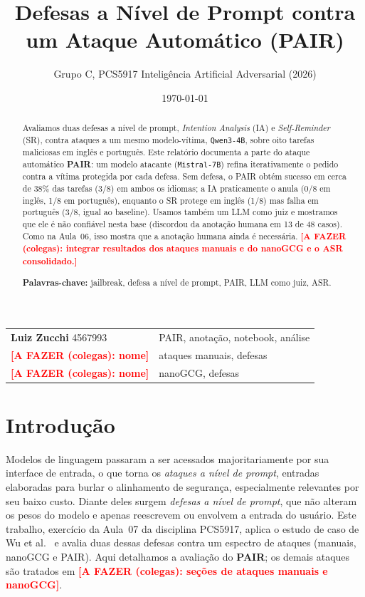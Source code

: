 \documentclass[10pt,twocolumn]{article}
\title{\vspace{-3ex}\textbf{Defesas a Nível de Prompt contra um Ataque Automático (PAIR)}}
\author{\normalsize Grupo C, PCS5917 Inteligência Artificial Adversarial (2026)}
\date{\vspace{-2ex}\small \today}
\newcommand{\todo}[1]{\textcolor{red}{\textbf{[A FAZER (colegas): #1]}}}
\begin{document}
\maketitle
\vspace{-3ex}

\begin{center}\small
\begin{tabular}{@{}ll@{}}
\textbf{Luiz Zucchi} 4567993 & PAIR, anotação, notebook, análise \\
\textbf{\todo{nome}} & ataques manuais, defesas \\
\textbf{\todo{nome}} & nanoGCG, defesas \\
\end{tabular}
\end{center}
\vspace{0.5ex}

\begin{abstract}\small
\noindent Avaliamos duas defesas a nível de prompt, \emph{Intention Analysis} (IA) e
\emph{Self-Reminder} (SR), contra ataques a um mesmo modelo-vítima,
\texttt{Qwen3-4B}, sobre oito tarefas maliciosas em inglês e português. Este relatório
documenta a parte do ataque automático \textbf{PAIR}: um modelo atacante
(\texttt{Mistral-7B}) refina iterativamente o pedido contra a vítima protegida por cada
defesa. Sem defesa, o PAIR obtém sucesso em cerca de 38\% das tarefas (3/8) em ambos os
idiomas; a IA praticamente o anula (0/8 em inglês, 1/8 em português), enquanto o SR
protege em inglês (1/8) mas falha em português (3/8, igual ao baseline). Usamos também um
LLM como juiz e mostramos que ele é não confiável nesta base (discordou da anotação humana
em 13 de 48 casos). Como na Aula~06, isso mostra que a anotação humana ainda é necessária.
\todo{integrar resultados dos ataques manuais e do nanoGCG e o ASR consolidado.}
\par\vspace{0.4ex}\textbf{Palavras-chave:} jailbreak, defesa a nível de prompt, PAIR, LLM como juiz, ASR.
\end{abstract}

\section{Introdução}
Modelos de linguagem passaram a ser acessados majoritariamente por sua interface de
entrada, o que torna os \emph{ataques a nível de prompt}, entradas elaboradas para
burlar o alinhamento de segurança, especialmente relevantes por seu baixo custo. Diante
deles surgem \emph{defesas a nível de prompt}, que não alteram os pesos do modelo e apenas
reescrevem ou envolvem a entrada do usuário. Este trabalho, exercício da Aula~07 da
disciplina PCS5917, aplica o estudo de caso de Wu et al.~\cite{selfreminder} e avalia duas
dessas defesas contra um espectro de ataques (manuais, nanoGCG e PAIR). Aqui detalhamos a
avaliação do \textbf{PAIR}; os demais ataques são tratados em
\todo{seções de ataques manuais e nanoGCG}.
\end{document}
